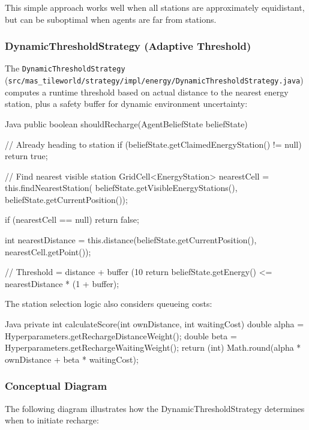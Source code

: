 \documentclass[titlepage=formal,code=listings,logo=../../assets/火炬+英文校名-左右.pdf]{../../SUSTechHomework}
\begin{document}
This simple approach works well when all stations are approximately equidistant, but can be suboptimal when agents are far from stations.

\subsubsection{DynamicThresholdStrategy (Adaptive Threshold)}

The \texttt{DynamicThresholdStrategy} (\texttt{src/mas\_tileworld/strategy/impl/energy/DynamicThresholdStrategy.java}) computes a runtime threshold based on actual distance to the nearest energy station, plus a safety buffer for dynamic environment uncertainty:

\begin{sustechcode}{Java}
public boolean shouldRecharge(AgentBeliefState beliefState) {
    // Already heading to station
    if (beliefState.getClaimedEnergyStation() != null) {
        return true;
    }

    // Find nearest visible station
    GridCell<EnergyStation> nearestCell = this.findNearestStation(
            beliefState.getVisibleEnergyStations(),
            beliefState.getCurrentPosition());

    if (nearestCell == null) return false;

    int nearestDistance = this.distance(beliefState.getCurrentPosition(),
            nearestCell.getPoint());

    // Threshold = distance + buffer (10%
    return beliefState.getEnergy() <= nearestDistance * (1 + buffer);
}
\end{sustechcode}

The station selection logic also considers queueing costs:

\begin{sustechcode}{Java}
private int calculateScore(int ownDistance, int waitingCost) {
    double alpha = Hyperparameters.getRechargeDistanceWeight();
    double beta = Hyperparameters.getRechargeWaitingWeight();
    return (int) Math.round(alpha * ownDistance + beta * waitingCost);
}
\end{sustechcode}

\subsubsection{Conceptual Diagram}

The following diagram illustrates how the DynamicThresholdStrategy determines when to initiate recharge:
\end{document}
